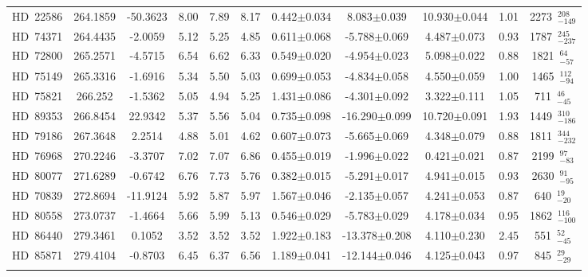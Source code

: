 {\begin{longtable}{lcccccccccc}
\noalign{\smallskip}
HD~22586 & 264.1859 & -50.3623 & 8.00 & 7.89 & 8.17 & 0.442$\pm$0.034 & 8.083$\pm$0.039 & 10.930$\pm$0.044 & 1.01 & 2273~$_{-149}^{208}$ \\
\noalign{\smallskip}
HD~74371 & 264.4435 & -2.0059 & 5.12 & 5.25 & 4.85 & 0.611$\pm$0.068 & -5.788$\pm$0.069 & 4.487$\pm$0.073 & 0.93 & 1787~$_{-237}^{245}$ \\
\noalign{\smallskip}
HD~72800 & 265.2571 & -4.5715 & 6.54 & 6.62 & 6.33 & 0.549$\pm$0.020 & -4.954$\pm$0.023 & 5.098$\pm$0.022 & 0.88 & 1821~$_{-57}^{64}$ \\
\noalign{\smallskip}
HD~75149 & 265.3316 & -1.6916 & 5.34 & 5.50 & 5.03 & 0.699$\pm$0.053 & -4.834$\pm$0.058 & 4.550$\pm$0.059 & 1.00 & 1465~$_{-94}^{112}$ \\
\noalign{\smallskip}
HD~75821 & 266.252 & -1.5362 & 5.05 & 4.94 & 5.25 & 1.431$\pm$0.086 & -4.301$\pm$0.092 & 3.322$\pm$0.111 & 1.05 & 711~$_{-45}^{46}$ \\
\noalign{\smallskip}
HD~89353 & 266.8454 & 22.9342 & 5.37 & 5.56 & 5.04 & 0.735$\pm$0.098 & -16.290$\pm$0.099 & 10.720$\pm$0.091 & 1.93 & 1449~$_{-186}^{310}$ \\
\noalign{\smallskip}
HD~79186 & 267.3648 & 2.2514 & 4.88 & 5.01 & 4.62 & 0.607$\pm$0.073 & -5.665$\pm$0.069 & 4.348$\pm$0.079 & 0.88 & 1811~$_{-232}^{344}$ \\
\noalign{\smallskip}
HD~76968 & 270.2246 & -3.3707 & 7.02 & 7.07 & 6.86 & 0.455$\pm$0.019 & -1.996$\pm$0.022 & 0.421$\pm$0.021 & 0.87 & 2199~$_{-83}^{97}$ \\
\noalign{\smallskip}
HD~80077 & 271.6289 & -0.6742 & 6.76 & 7.73 & 5.76 & 0.382$\pm$0.015 & -5.291$\pm$0.017 & 4.941$\pm$0.015 & 0.93 & 2630~$_{-95}^{91}$ \\
\noalign{\smallskip}
HD~70839 & 272.8694 & -11.9124 & 5.92 & 5.87 & 5.97 & 1.567$\pm$0.046 & -2.135$\pm$0.057 & 4.241$\pm$0.053 & 0.87 & 640~$_{-20}^{19}$ \\
\noalign{\smallskip}
HD~80558 & 273.0737 & -1.4664 & 5.66 & 5.99 & 5.13 & 0.546$\pm$0.029 & -5.783$\pm$0.029 & 4.178$\pm$0.034 & 0.95 & 1862~$_{-100}^{116}$ \\
\noalign{\smallskip}
HD~86440 & 279.3461 & 0.1052 & 3.52 & 3.52 & 3.52 & 1.922$\pm$0.183 & -13.378$\pm$0.208 & 4.110$\pm$0.230 & 2.45 & 551~$_{-45}^{52}$ \\
\noalign{\smallskip}
HD~85871 & 279.4104 & -0.8703 & 6.45 & 6.37 & 6.56 & 1.189$\pm$0.041 & -12.144$\pm$0.046 & 4.125$\pm$0.043 & 0.97 & 845~$_{-29}^{29}$ \\
\noalign{\smallskip}

\end{longtable}}
